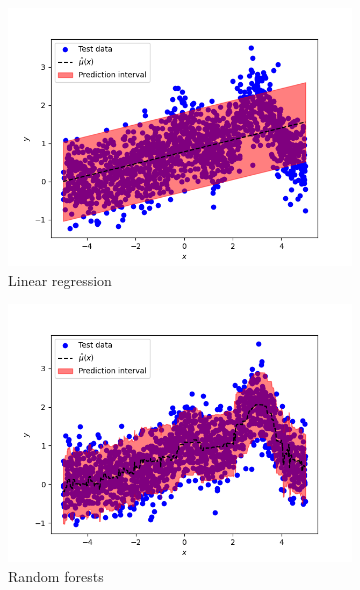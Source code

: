 \documentclass[11pt, titlepage]{article} %
\numberwithin{equation}{section}
\theoremstyle{definition}
\numberwithin{theorem}{section}
\numberwithin{lemma}{section}
\numberwithin{corollary}{section}
\numberwithin{proposition}{section}
\numberwithin{definition}{section}
\numberwithin{remark}{section}
\begin{document}
\begin{figure}[H]
    \centering
    \begin{subfigure}{0.49\textwidth}
        \includegraphics[width=\linewidth]{figures/2_3_LR.png}    
        \caption{Linear regression} \label{fig:2_3_LR}
    \end{subfigure}
    \begin{subfigure}{0.49\textwidth}
        \includegraphics[width=\linewidth]{figures/2_3_RF.png}
        \caption{Random forests} \label{fig:2_3_RF}
    \end{subfigure}
    \begin{subfigure}{0.49\textwidth}

\end{subfigure}
\end{figure}
\end{document}
